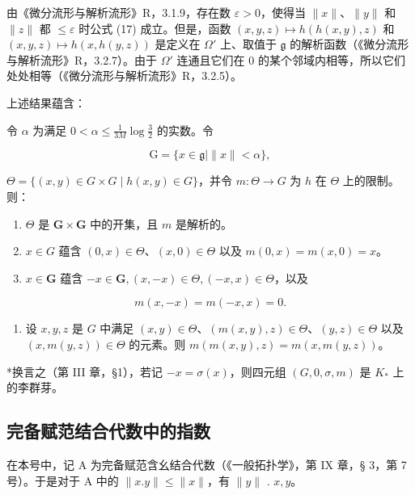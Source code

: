 由《微分流形与解析流形》R，3.1.9，存在数 \(\varepsilon > 0\)，使得当 \(\|x\|\)、\(\|y\|\) 和 \(\|z\|\) 都 \(\leqslant \varepsilon\) 时公式 (17) 成立。但是，函数 \((x,y,z)\mapsto h(h(x,y),z)\) 和 \((x,y,z)\mapsto h(x,h(y,z))\) 是定义在 \(\Omega'\) 上、取值于 \(\mathfrak{g}\) 的解析函数（《微分流形与解析流形》R，3.2.7）。由于 \(\Omega'\) 连通且它们在 0 的某个邻域内相等，所以它们处处相等（《微分流形与解析流形》R，3.2.5）。

上述结果蕴含：

令 \(\alpha\) 为满足 \(0 < \alpha \leqslant \frac{1}{3M} \log \frac{3}{2}\) 的实数。令

\[
\mathrm{G} = \{x \in \mathfrak {g} \mid \| x \| <   \alpha \},
\]

\(\Theta = \{(x,y) \in G \times G \mid h(x,y) \in G\}\)，并令 \(m: \Theta \to G\) 为 \(h\) 在 \(\Theta\) 上的限制。则：

\begin{enumerate}
\def\labelenumi{(\arabic{enumi})}
\item
  \(\Theta\) 是 \(\mathbf{G} \times \mathbf{G}\) 中的开集，且 \(m\) 是解析的。
\item
  \(x \in G\) 蕴含 \((0, x) \in \Theta\)、\((x, 0) \in \Theta\) 以及 \(m(0, x) = m(x, 0) = x\)。
\item
  \(x \in \mathbf{G}\) 蕴含 \(-x \in \mathbf{G}, (x, -x) \in \Theta, (-x, x) \in \Theta\)，以及
\end{enumerate}

\[
m (x, - x) = m (- x, x) = 0.
\]

\begin{enumerate}
\def\labelenumi{(\arabic{enumi})}
\setcounter{enumi}{3}
\tightlist
\item
  设 \(x, y, z\) 是 \(G\) 中满足 \((x, y) \in \Theta\)、\((m(x, y), z) \in \Theta\)、\((y, z) \in \Theta\) 以及 \((x, m(y, z)) \in \Theta\) 的元素。则 \(m(m(x, y), z) = m(x, m(y, z))\)。
\end{enumerate}

*换言之（第 III 章，§1），若记 \(-x = \sigma(x)\)，则四元组 \((G, 0, \sigma, m)\) 是 \(K_*\) 上的李群芽。

\subsection{完备赋范结合代数中的指数}

在本号中，记 A 为完备赋范含幺结合代数（《一般拓扑学》，第 IX 章，§ 3，第 7 号）。于是对于 A 中的 \(\| x.y\| \leqslant \| x\|\)，有 \(\| y\|\) . \(x,y\)。

